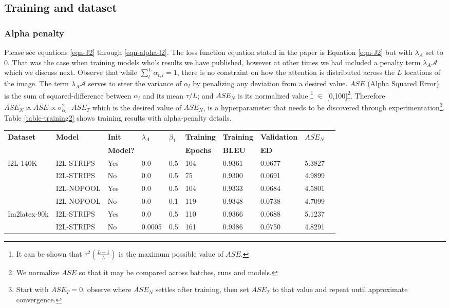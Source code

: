 \documentclass{article}
\begin{document}
\subsection{Training and dataset}
\subsubsection{Alpha penalty}
Please see equations \ref{eqn-J2} through \ref{eqn-alpha-l2}. The loss function equation stated in the paper is Equation \ref{eqn-J2} but with $\lambda_A$ set to 0. That was the case when training models who's results we have published, however at other times we had included a penalty term $\lambda_A \mathcal{A}$ which we discuss next. Observe that while {$\sum_{l}^{L} \alpha_{t,l} = 1 $}, there is no constraint on how the attention is distributed across the $L$ locations of the image. The term $\lambda_{A}\mathcal{A}$ serves to steer the variance of $\alpha_l$ by penalizing any deviation from a desired value. ${ASE}$ (Alpha Squared Error) is the sum of squared-difference between $\alpha_l$ and its mean $\tau/L$; and $ASE_N$ is its normalized value \footnote{It can be shown that  $\tau^2 \left( \frac{L-1}{L} \right)$ is the maximum possible value of $ASE$.} $\in$ [0,100]\footnote{We normalize $ASE$ so that it may be compared across batches, runs and models.}. Therefore $ASE_N \propto ASE \propto \sigma_{\alpha_l}^2$.  $ASE_T$ which is the desired value of $ASE_N$, is a hyperparameter that needs to be discovered through experimentation\footnote{Start with $ASE_T=0$, observe where $ASE_N$ settles after training, then set $ASE_T$ to that value and repeat until approximate convergence.}. Table \ref{table-training2} shows training results with alpha-penalty details.
\begin{table*}[!hbtp]
	\caption{Training metrics. $\lambda_R=0.00005 \text{~and~} \beta_2 = 0.9$ for all runs.}
	\begin{tabular}{lll|lll|llll}
		\hline
		\textbf{Dataset} & \textbf{Model} & \textbf{Init}  & \textbf{$\lambda_A$}  &\textbf{$\beta_1$}  & \textbf{Training}  & \textbf{Training}   & \textbf{Validation} & ${\overline{ASE_N}}$\\
		                 &                & \textbf{Model?}&                       &                    & \textbf{Epochs}    & \textbf{BLEU}       & \textbf{ED}         & \\
		\hline 
		I2L-140K    & I2L-STRIPS & Yes & 0.0    & 0.5 & 104 & 0.9361 & 0.0677 & 5.3827 \\
				    & I2L-STRIPS & No  & 0.0    & 0.5 & 75  & 0.9300 & 0.0691 & 4.9899\\
					& I2L-NOPOOL & Yes & 0.0    & 0.5 & 104 & 0.9333 & 0.0684 & 4.5801\\
					& I2L-NOPOOL & No  & 0.0    & 0.1 & 119 & 0.9348 & 0.0738 & 4.7099\\ 
		\hline
		Im2latex-90k& I2L-STRIPS & Yes & 0.0    & 0.5 & 110 & 0.9366 & 0.0688 & 5.1237\\
		& I2L-STRIPS & No  & 0.0005 & 0.5 & 161 & 0.9386 & 0.0750 & 4.8291\\
		\hline
	\end{tabular}
	\centering
	\label{table-training2}
\end{table*}
\end{document}
